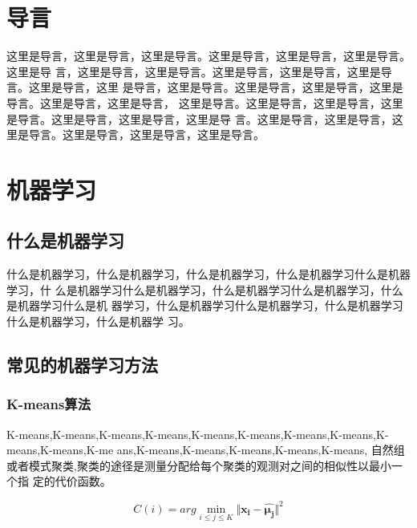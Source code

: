 \section{导言}
这里是导言，这里是导言，这里是导言。这里是导言，这里是导言，这里是导言。这里是导
言，这里是导言，这里是导言。这里是导言，这里是导言，这里是导言。这里是导言，这里
是导言，这里是导言。这里是导言，这里是导言，这里是导言。这里是导言，这里是导言，
这里是导言。这里是导言，这里是导言，这里是导言。这里是导言，这里是导言，这里是导
言。这里是导言，这里是导言，这里是导言。这里是导言，这里是导言，这里是导言。
\section{机器学习}
\subsection{什么是机器学习}
\par 
什么是机器学习，什么是机器学习，什么是机器学习，什么是机器学习什么是机器学习，什
么是机器学习什么是机器学习，什么是机器学习什么是机器学习，什么是机器学习什么是机
器学习，什么是机器学习什么是机器学习，什么是机器学习什么是机器学习，什么是机器学
习\cite{机器学习技术的应用经验及建议探讨}。

\subsection{常见的机器学习方法}
\subsubsection{K-means算法}
\par 
K-means,K-means,K-means,K-means,K-means,K-means,K-means,K-means,K-means,K-means,K-me
ans,K-means,K-means,K-means,K-means,K-means,
自然组或者模式聚类,聚类的途径是测量分配给每个聚类的观测对之间的相似性以最小一个指
定的代价函数\cite{Simon2011神经网络与机器学习}。

\begin{equation}
	C\left(i\right) = arg \min_{i \le j \le K}    \Vert \mathbf{x_i}  - \hat{\mathbf{\mu_j}} \Vert^{2}  
\end{equation}
	
